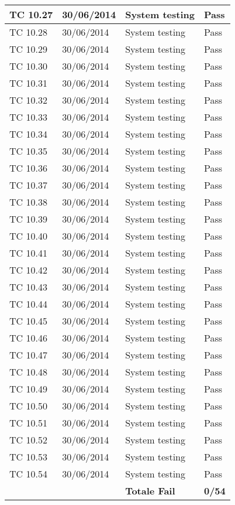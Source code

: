 \begin{longtable}{|p{3cm}|p{3cm}|p{3cm}|p{3cm}|}
	\hline
	TC 10.27			& 30/06/2014 			& System testing		& Pass \tabularnewline
	\hline
	TC 10.28			& 30/06/2014 			& System testing		& Pass \tabularnewline
	\hline
	TC 10.29			& 30/06/2014 			& System testing		& Pass \tabularnewline
	\hline
	TC 10.30			& 30/06/2014 			& System testing		& Pass \tabularnewline
	\hline
	TC 10.31			& 30/06/2014 			& System testing		& Pass \tabularnewline
	\hline
	TC 10.32			& 30/06/2014 			& System testing		& Pass \tabularnewline
	\hline
	TC 10.33			& 30/06/2014 			& System testing		& Pass \tabularnewline
	\hline
	TC 10.34			& 30/06/2014 			& System testing		& Pass \tabularnewline
	\hline
	TC 10.35			& 30/06/2014 			& System testing		& Pass \tabularnewline
	\hline
	TC 10.36			& 30/06/2014 			& System testing		& Pass \tabularnewline
	\hline
	TC 10.37			& 30/06/2014 			& System testing		& Pass \tabularnewline
	\hline
	TC 10.38			& 30/06/2014 			& System testing		& Pass \tabularnewline
	\hline
	TC 10.39			& 30/06/2014 			& System testing		& Pass \tabularnewline
	\hline
	TC 10.40			& 30/06/2014 			& System testing		& Pass \tabularnewline
	\hline
	TC 10.41			& 30/06/2014 			& System testing		& Pass \tabularnewline
	\hline
	TC 10.42			& 30/06/2014 			& System testing		& Pass \tabularnewline
	\hline
	TC 10.43			& 30/06/2014 			& System testing		& Pass \tabularnewline
	\hline
	TC 10.44			& 30/06/2014 			& System testing		& Pass \tabularnewline
	\hline
	TC 10.45			& 30/06/2014 			& System testing		& Pass \tabularnewline
	\hline
	TC 10.46			& 30/06/2014 			& System testing		& Pass \tabularnewline
	\hline
	TC 10.47			& 30/06/2014 			& System testing		& Pass \tabularnewline
	\hline
	TC 10.48			& 30/06/2014 			& System testing		& Pass \tabularnewline
	\hline
	TC 10.49			& 30/06/2014 			& System testing		& Pass \tabularnewline
	\hline
	TC 10.50			& 30/06/2014 			& System testing		& Pass \tabularnewline
	\hline
	TC 10.51			& 30/06/2014 			& System testing		& Pass \tabularnewline
	\hline
	TC 10.52			& 30/06/2014 			& System testing		& Pass \tabularnewline
	\hline
	TC 10.53			& 30/06/2014 			& System testing		& Pass \tabularnewline
	\hline
	TC 10.54			& 30/06/2014 			& System testing		& Pass \tabularnewline
	\hline
					& 						& \textbf{Totale Fail}	& \textbf{0/54} \tabularnewline
	\hline
\end{longtable}